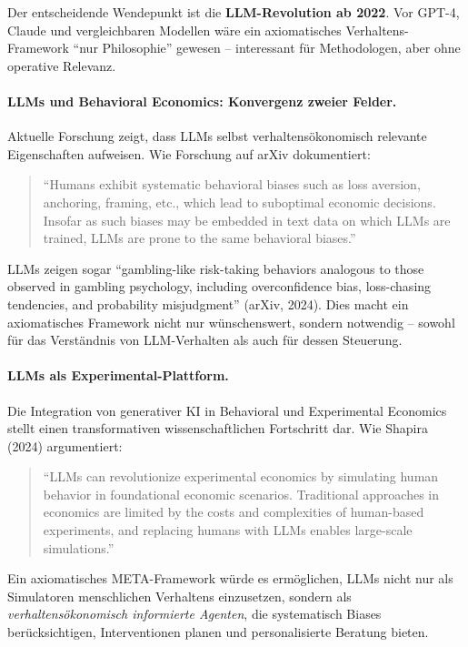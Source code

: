 Der entscheidende Wendepunkt ist die \textbf{LLM-Revolution ab 2022}. Vor GPT-4, Claude und vergleichbaren Modellen wäre ein axiomatisches Verhaltens-Framework ``nur Philosophie'' gewesen -- interessant für Methodologen, aber ohne operative Relevanz.

\paragraph{LLMs und Behavioral Economics: Konvergenz zweier Felder.}
Aktuelle Forschung zeigt, dass LLMs selbst verhaltensökonomisch relevante Eigenschaften aufweisen. Wie Forschung auf arXiv dokumentiert:

\begin{quote}
``Humans exhibit systematic behavioral biases such as loss aversion, anchoring, framing, etc., which lead to suboptimal economic decisions. Insofar as such biases may be embedded in text data on which LLMs are trained, LLMs are prone to the same behavioral biases.''
\end{quote}

LLMs zeigen sogar ``gambling-like risk-taking behaviors analogous to those observed in gambling psychology, including overconfidence bias, loss-chasing tendencies, and probability misjudgment'' (arXiv, 2024). Dies macht ein axiomatisches Framework nicht nur wünschenswert, sondern notwendig -- sowohl für das Verständnis von LLM-Verhalten als auch für dessen Steuerung.

\paragraph{LLMs als Experimental-Plattform.}
Die Integration von generativer KI in Behavioral und Experimental Economics stellt einen transformativen wissenschaftlichen Fortschritt dar. Wie Shapira (2024) argumentiert:

\begin{quote}
``LLMs can revolutionize experimental economics by simulating human behavior in foundational economic scenarios. Traditional approaches in economics are limited by the costs and complexities of human-based experiments, and replacing humans with LLMs enables large-scale simulations.''
\end{quote}

Ein axiomatisches META-Framework würde es ermöglichen, LLMs nicht nur als Simulatoren menschlichen Verhaltens einzusetzen, sondern als \textit{verhaltensökonomisch informierte Agenten}, die systematisch Biases berücksichtigen, Interventionen planen und personalisierte Beratung bieten.

